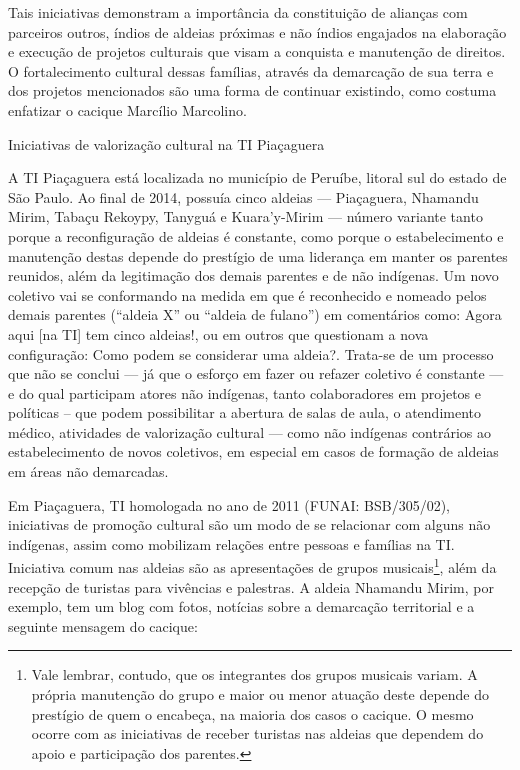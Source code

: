 \documentclass{article}
\begin{document}
Tais iniciativas demonstram a import\^ancia da constitui\c{c}\~ao de
alian\c{c}as com parceiros outros, \'indios de aldeias pr\'oximas e
n\~ao \'indios engajados na elabora\c{c}\~ao e execu\c{c}\~ao de
projetos culturais que visam a conquista e manuten\c{c}\~ao de
direitos. O fortalecimento cultural dessas fam\'ilias, atrav\'es da
demarca\c{c}\~ao de sua terra e dos projetos mencionados s\~ao uma
forma de continuar existindo, como costuma enfatizar o cacique
Marc\'ilio Marcolino.  

Iniciativas de valoriza\c{c}\~ao cultural na TI Pia\c{c}aguera

A TI Pia\c{c}aguera est\'a localizada no munic\'ipio de Peru\'ibe,
litoral sul do estado de S\~ao Paulo. Ao final de 2014, possu\'ia cinco
aldeias --- Pia\c{c}aguera, Nhamandu Mirim, Taba\c{c}u Rekoypy,
Tanygu\'a e Kuara{\textquoteright}y-Mirim --- n\'umero variante tanto
porque a reconfigura\c{c}\~ao de aldeias \'e constante, como porque o
estabelecimento e manuten\c{c}\~ao destas depende do prest\'igio de uma
lideran\c{c}a em manter os parentes reunidos, al\'em da
legitima\c{c}\~ao dos demais parentes e de n\~ao ind\'igenas. Um novo
coletivo vai se conformando na medida em que \'e reconhecido e nomeado
pelos demais parentes ({\textquotedblleft}aldeia X{\textquotedblright}
ou {\textquotedblleft}aldeia de fulano{\textquotedblright}) em
coment\'arios como: Agora aqui [na TI] tem cinco aldeias!, ou em outros
que questionam a nova configura\c{c}\~ao: Como podem se considerar uma
aldeia?. Trata-se de um processo que n\~ao se conclui --- j\'a que o
esfor\c{c}o em fazer ou refazer coletivo \'e constante --- e do qual
participam atores n\~ao ind\'igenas, tanto colaboradores em projetos e
pol\'iticas -- que podem possibilitar a abertura de salas de aula, o
atendimento m\'edico, atividades de valoriza\c{c}\~ao cultural --- como
n\~ao ind\'igenas contr\'arios ao estabelecimento de novos coletivos,
em especial em casos de forma\c{c}\~ao de aldeias em \'areas n\~ao
demarcadas. 

Em Pia\c{c}aguera, TI homologada no ano de 2011 (FUNAI: BSB/305/02),
iniciativas de promo\c{c}\~ao cultural s\~ao um modo de se relacionar
com alguns n\~ao ind\'igenas, assim como mobilizam rela\c{c}\~oes entre
pessoas e fam\'ilias na TI. Iniciativa comum nas aldeias s\~ao as
apresenta\c{c}\~oes de grupos musicais\footnote{ Vale lembrar, contudo,
que os integrantes dos grupos musicais variam. A pr\'opria
manuten\c{c}\~ao do grupo e maior ou menor atua\c{c}\~ao deste depende
do prest\'igio de quem o encabe\c{c}a, na maioria dos casos o cacique.
O mesmo ocorre com as iniciativas de receber turistas nas aldeias que
dependem do apoio e participa\c{c}\~ao dos parentes.}, al\'em da
recep\c{c}\~ao de turistas para viv\^encias e palestras. A aldeia
Nhamandu Mirim, por exemplo, tem um blog com fotos, not\'icias sobre a
demarca\c{c}\~ao territorial e a seguinte mensagem do cacique:
\end{document}

